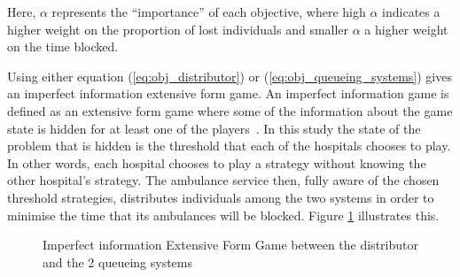Here, \(\alpha\) represents the ``importance'' of each objective,
where high \(\alpha\) indicates a higher weight on the proportion of lost 
individuals and smaller \(\alpha\) a higher weight on the time blocked. 

Using either equation (\ref{eq:obj_distributor}) or 
(\ref{eq:obj_queueing_systems}) gives an imperfect information extensive form 
game. 
An imperfect information game is defined as an extensive form game where some 
of the information about the game state is hidden for at least one of the 
players~\cite{Berwanger2008}. In this study the state of the problem that is
hidden is the threshold that each of the hospitals chooses to play.
In other words, each hospital chooses to play a strategy without 
knowing the other hospital's strategy.
The ambulance service then, fully aware of the chosen threshold strategies, 
distributes individuals among the two systems in order to minimise the time 
that its ambulances will be blocked. 
Figure \ref{fig:imperfect_info_game} illustrates this. 

\begin{figure}[ht]
    \centering
    \caption{Imperfect information Extensive Form Game between the distributor 
    and the 2 queueing systems}
    \label{fig:imperfect_info_game}
\end{figure}

